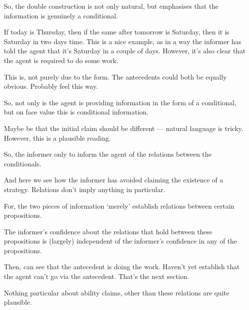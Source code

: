 \documentclass[10pt]{article}
\begin{document}
So, the double construction is not only natural, but emphasises that the information is genuinely a conditional.

If today is Thursday, then if the same after tomorrow is Saturday, then it is Saturday in two days time.
This is a nice example, as in a way the informer has told the agent that it's Saturday in a couple of days.
However, it's also clear that the agent is required to do some work.

This is, not purely due to the form.
The antecedents could both be equally obvious.
Probably feel this way.



So, not only is the agent is providing information in the form of a conditional, but on face value this is conditional information.

Maybe be that the initial claim should be different --- natural language is tricky.
However, this is a plausible reading.

So, the informer only to inform the agent of the relations between the conditionals.

And here we see how the informer has avoided claiming the existence of a strategy.
Relations don't imply anything in particular.

For, the two pieces of information `merely' establish relations between certain propositions.


The informer's confidence about the relations that hold between these propositions is (largely) independent of the informer's confidence in any of the propositions.









Then, can see that the antecedent is doing the work.
Haven't yet establish that the agent can't go via the antecedent.
That's the next section.








Nothing particular about ability claims, other than these relations are quite plausible.
\end{document}
